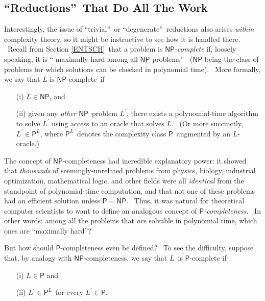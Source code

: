 \documentclass[12pt,onecolumn]{article}%
\begin{document}
\subsection{\textquotedblleft Reductions\textquotedblright\ That Do All The
Work\label{REDUCTIONS}}

Interestingly, the issue of \textquotedblleft trivial\textquotedblright\ or
\textquotedblleft degenerate\textquotedblright\ reductions also arises
\textit{within} complexity theory, so it might be instructive to see how it is
handled there. \ Recall from Section \ref{ENTSCH}\ that a problem is
$\mathsf{NP}$\textit{-complete} if, loosely speaking, it is \textquotedblleft
maximally hard among all $\mathsf{NP}$ problems\textquotedblright%
\ ($\mathsf{NP}$ being the class of problems for which solutions can be
checked in polynomial time). \ More formally, we say that $L$ is $\mathsf{NP}$-complete\ if

\begin{enumerate}
\item[(i)] $L\in\mathsf{NP}$, and

\item[(ii)] given any \textit{other} $\mathsf{NP}$\ problem $L^{\prime}$,
there exists a polynomial-time algorithm to solve $L^{\prime}$ using access to
an oracle that solves $L$. \ (Or more succinctly, $L^{\prime}\in\mathsf{P}%
^{L}$, where $\mathsf{P}^{L}$\ denotes the complexity class $\mathsf{P}%
$\ augmented by an $L$-oracle.)
\end{enumerate}

The concept of $\mathsf{NP}$-completeness had incredible explanatory power: it
showed that \textit{thousands} of seemingly-unrelated problems from physics,
biology, industrial optimization, mathematical logic, and other fields were
all \textit{identical} from the standpoint of polynomial-time computation, and
that not one of these problems had an efficient solution unless $\mathsf{P}%
=\mathsf{NP}$. \ Thus, it was natural for theoretical computer scientists to
want to define an analogous concept of $\mathsf{P}$\textit{-completeness}.
\ In other words: among all the problems that \textit{are} solvable in
polynomial time, which ones are \textquotedblleft maximally
hard\textquotedblright?

But how should $\mathsf{P}$-completeness even be defined? \ To see the
difficulty, suppose that, by analogy with $\mathsf{NP}$-completeness, we say
that $L$\ is $\mathsf{P}$-complete if

\begin{enumerate}
\item[(i)] $L\in\mathsf{P}$ and

\item[(ii)] $L^{\prime}\in\mathsf{P}^{L}$\ for every $L^{\prime}\in\mathsf{P}$.
\end{enumerate}
\end{document}
